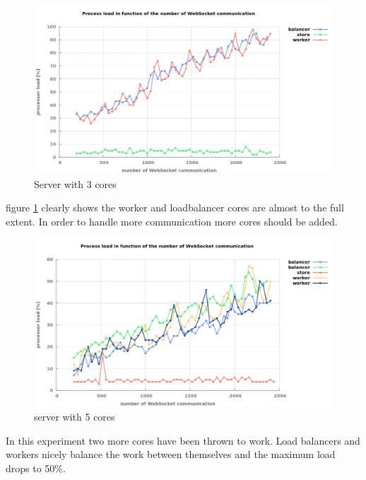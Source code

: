 \begin{figure}[H]
	\centering
		\includegraphics[width=\textwidth]{./Figures/WS_server_1rising.png}
	\caption[WS_server_1rising]{Server with 3 cores}
	\label{fig:WS_server_1rising}
\end{figure}

figure \ref{fig:WS_server_1rising} clearly shows the worker and loadbalancer
cores are almost to the full extent. In order to handle more communication more
cores should be added. 

\begin{figure}[H]
	\centering
		\includegraphics[width=\textwidth]{./Figures/WS_server_2rising.png}
	\caption[WS_server_2rising]{server with 5 cores}
	\label{fig:WS_server_2rising}
\end{figure}

In this experiment two more cores have been thrown to work. Load balancers and
workers nicely balance the work between themselves and the maximum load drops to 50\%.

